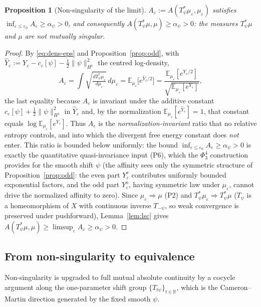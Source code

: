 \documentclass[12pt]{article}
\newcommand{\bR}{\mathbb{R}}
\newcommand{\bE}{\mathbb{E}}
\newcommand{\eps}{\varepsilon}
\theoremstyle{plain}
\newtheorem{proposition}{Proposition}
\theoremstyle{definition}
\begin{document}
\begin{proposition}[Non-singularity of the limit]\label{prop:nonsing}
$A_\eps:=A(T_\psi^*\mu_\eps,\mu_\eps)$ satisfies $\inf_{\eps\le\eps_0}A_\eps\ge\alpha_\psi>0$,
and consequently $A(T_\psi^*\mu,\mu)\ge\alpha_\psi>0$: the measures $T_\psi^*\mu$ and
$\mu$ are not mutually singular.
\end{proposition}

\begin{proof}
By \eqref{eq:dens-eps} and Proposition~\ref{prop:odd}, with
$\widehat Y_\eps:=Y_\eps-c_\eps[\psi]-\tfrac12\|\psi\|_{H^1}^2$ the centred
log-density,
\[
A_\eps=\int\sqrt{\tfrac{dT_\psi^*\mu_\eps}{d\mu_\eps}}\,d\mu_\eps
=\bE_{\mu_\eps}\!\big[e^{\widehat Y_\eps/2}\big]
=\frac{\bE_{\mu_\eps}[e^{Y_\eps/2}]}{\sqrt{\bE_{\mu_\eps}[e^{Y_\eps}]}},
\]
the last equality because $A_\eps$ is invariant under the additive constant
$c_\eps[\psi]+\tfrac12\|\psi\|_{H^1}^2$ in $\widehat Y_\eps$ and, by the
normalization $\bE_{\mu_\eps}[e^{\widehat Y_\eps}]=1$, that constant equals
$\log\bE_{\mu_\eps}[e^{Y_\eps}]$. Thus $A_\eps$ is the \emph{normalization-invariant}
ratio that no relative entropy controls, and into which the divergent free energy
constant does \emph{not} enter. This ratio is bounded below uniformly: the bound
$\inf_{\eps\le\eps_0}A_\eps\ge\alpha_\psi>0$ is exactly the quantitative
quasi-invariance input (P6), which the $\Phi^4_3$ construction provides for the
smooth shift $\psi$ (the affinity sees only the symmetric structure of
Proposition~\ref{prop:odd}: the even part $Y^{\mathrm{e}}_\eps$ contributes uniformly
bounded exponential factors, and the odd part $Y^{\mathrm{o}}_\eps$, having
symmetric law under $\mu_\eps$, cannot drive the normalized affinity to zero). Since
$\mu_\eps\Rightarrow\mu$ (P2) and $T_\psi^*\mu_\eps\Rightarrow T_\psi^*\mu$ ($T_\psi$
is a homeomorphism of $X$ with continuous inverse $T_{-\psi}$, so weak convergence is
preserved under pushforward), Lemma~\ref{lem:lsc} gives
$A(T_\psi^*\mu,\mu)\ge\limsup_\eps A_\eps\ge\alpha_\psi>0$.
\end{proof}

\subsection{From non-singularity to equivalence}
Non-singularity is upgraded to full mutual absolute continuity by a cocycle
argument along the one-parameter shift group $\{T_{t\psi}\}_{t\in\bR}$, which is the
Cameron--Martin direction generated by the fixed smooth $\psi$.
\end{document}

